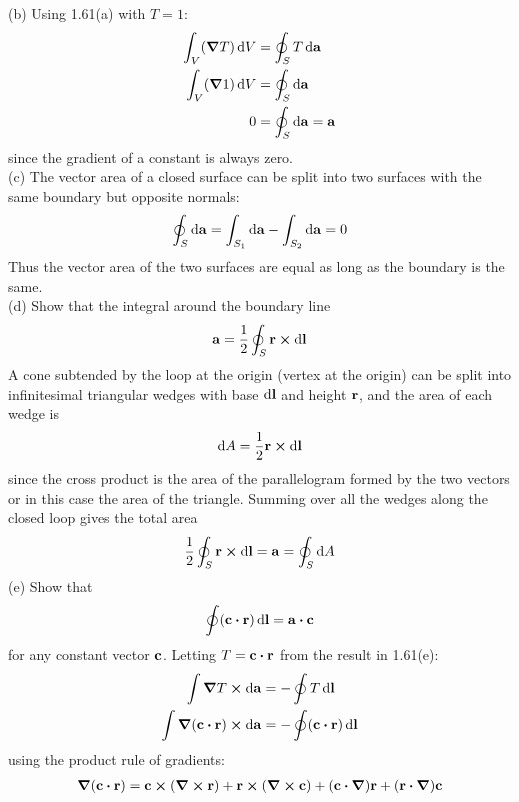 \documentclass[../main.tex]{subfiles}
\begin{document}
(b) Using 1.61(a) with $T = 1$:
\begin{align*}
    \int_V (\grad T) \dd{V} &= \oint_S T \dd{\vb{a}} \\
    \int_V (\grad 1) \dd{V} &= \oint_S \dd{\vb{a}} \\
    0 &= \oint_S \dd{\vb{a}} = \vb{a}
\end{align*}
since the gradient of a constant is always zero. \\
(c) The vector area of a closed surface can be split into two surfaces with the same boundary but
opposite normals:
\begin{align*}
    \oint_S \dd{\vb{a}} = \int_{S_1} \dd{\vb{a}} - \int_{S_2} \dd{\vb{a}} = 0
\end{align*}
Thus the vector area of the two surfaces are equal as long as the boundary is the same. \\
(d) Show that the integral around the boundary line
\begin{align*}
    \vb{a} = \frac{1}{2} \oint_S \vb{r} \cp \dd{\vb{l}}
\end{align*}
A cone subtended by the loop at the origin (vertex at the origin) can be split into infinitesimal
triangular wedges with base $\dd{\vb{l}}$ and height $\vb{r}$, and the area of each wedge is
\begin{align*}
    \dd{A} = \frac{1}{2} \vb{r} \cp \dd{\vb{l}}
\end{align*}
since the cross product is the area of the parallelogram formed by the two vectors or in this case
the area of the triangle. Summing over all the wedges along the closed loop gives the total area
\begin{align*}
    \frac{1}{2} \oint_S \vb{r} \cp \dd{\vb{l}} = \vb{a} = \oint_S \dd{A} 
\end{align*}
(e) Show that
\begin{align*}
    \oint (\vb{c} \vdot \vb{r}) \dd{\vb{l}} = \vb{a} \vdot \vb{c}
\end{align*}
for any constant vector $\vb{c}$. Letting $T = \vb{c} \vdot \vb{r}$ from the result in 1.61(e):
\begin{align*}
    \int \grad T \cp \dd{\vb{a}} &= - \oint T \dd{\vb{l}} \\
    \int \grad (\vb{c} \vdot \vb{r}) \cp \dd{\vb{a}} &= - \oint (\vb{c} \vdot \vb{r}) \dd{\vb{l}}
\end{align*}
using the product rule of gradients:
\begin{align*}
    \grad(\vb{c} \vdot \vb{r}) = \vb{c} \cp (\curl \vb{r}) + \vb{r} \cp (\curl \vb{c})
        + (\vb{c} \vdot \grad) \vb{r} + (\vb{r} \vdot \grad) \vb{c}
\end{align*}
\end{document}
